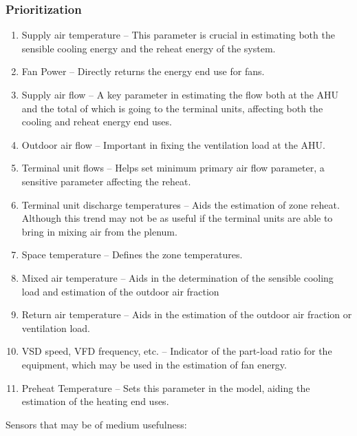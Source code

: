 \subsubsection{Prioritization} \label{sec:Prioritization}
\begin{enumerate}
\item Supply air temperature -- This parameter is crucial in estimating both the sensible cooling energy and the reheat energy of the system. 
\item Fan Power -- Directly returns the energy end use for fans.
\item Supply air flow -- A key parameter in estimating the flow both at the AHU and the total of which is going to the terminal units, affecting both the cooling and reheat energy end uses.
\item Outdoor air flow -- Important in fixing the ventilation load at the AHU.
\item Terminal unit flows -- Helps set minimum primary air flow parameter, a sensitive parameter affecting the reheat. 
\item Terminal unit discharge temperatures -- Aids the estimation of zone reheat. Although this trend may not be as useful if the terminal units are able to bring in mixing air from the plenum. 
\item Space temperature -- Defines the zone temperatures. 
\item Mixed air temperature -- Aids in the determination of the sensible cooling load and estimation of the outdoor air fraction
\item Return air temperature -- Aids in the estimation of the outdoor air fraction or ventilation load.
\item VSD speed, VFD frequency, etc. -- Indicator of the part-load ratio for the equipment, which may be used in the estimation of fan energy. 
\item Preheat Temperature -- Sets this parameter in the model, aiding the estimation of the heating end uses.
\end{enumerate}

Sensors that may be of medium usefulness:

